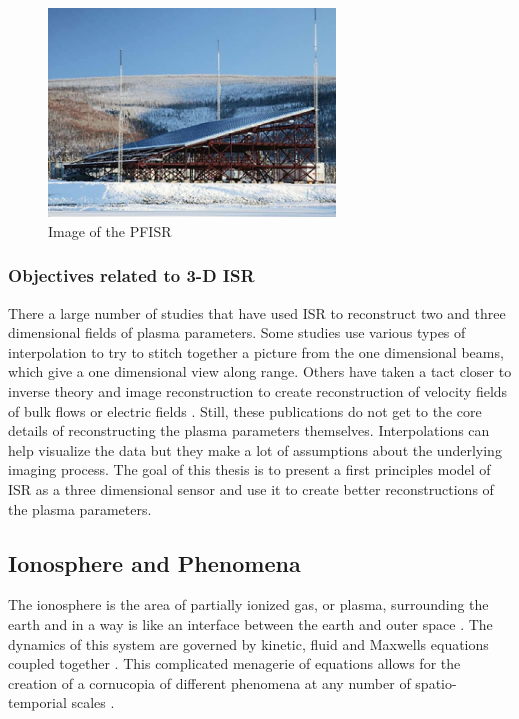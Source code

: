 \begin{figure}[!t]
\centering
\includegraphics[width=3in]{amisrimage}
\caption{Image of the PFISR \cite{SRIpage}}
\label{fig:amisrpic}
\end{figure}

\subsubsection{Objectives related to 3-D ISR}
There a large number of studies that have used ISR to reconstruct two and three dimensional fields of plasma parameters. Some studies use various types of interpolation to try to stitch together a picture from the one dimensional beams, which give a one dimensional view along range\cite{Semeter2009738,Butler:2013ul,Semeter:2005fo}. Others have taken a tact closer to inverse theory and image reconstruction to create reconstruction of velocity fields of bulk flows or electric fields \cite{butler:imagingfregiondrifts,RDS:RDS20195}. Still, these publications do not get to the core details of reconstructing the plasma parameters themselves. Interpolations can help visualize the data but they make a lot of assumptions about the underlying imaging process. The goal of this thesis is to present a first principles model of ISR as a three dimensional sensor and use it to create better reconstructions of the plasma parameters.

\subsection{Ionosphere and Phenomena}
The ionosphere is the area of partially ionized gas, or plasma, surrounding the earth and in a way is like an interface between the earth and outer space \cite{kellybook}. The dynamics of this system are governed by kinetic, fluid and Maxwells equations coupled together \cite{schunk2004ionospheres}. This complicated menagerie of equations allows for the creation of a cornucopia of different phenomena at any number of spatio-temporial scales \cite{Semeter:2008hs,Semeter2009738}.

